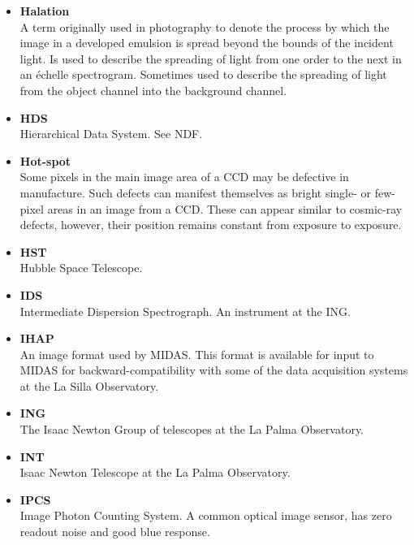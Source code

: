 \documentclass[twoside,11pt]{article}
\newcommand{\htmlref}[2]{#1}
\begin{document}
\begin{itemize}
\item {\bf\label{gl_halation}Halation}\\
      A term originally used in photography to denote the process by which
      the image in a developed emulsion is spread beyond the bounds of the
      incident light.  Is used to describe the spreading of light from
      one order to the next in an \'{e}chelle spectrogram.  Sometimes used
      to describe the spreading of light from the object channel into the
      background channel.

\item {\bf\label{gl_hds}HDS}\\
      Hierarchical Data System.  See \htmlref{NDF}{gl_ndf}.

\item {\bf\label{gl_hotspot}Hot-spot}\\
      Some pixels in the main image area of a \htmlref{CCD}{gl_ccd} may
      be defective in manufacture.  Such defects can manifest themselves
      as bright single- or few-pixel areas in an image from a CCD\@.
      These can appear similar to cosmic-ray defects, however, their
      position remains constant from exposure to exposure.

\item {\bf\label{gl_hst}HST}\\
      Hubble Space Telescope.

\item {\bf\label{gl_ids}IDS}\\
      Intermediate Dispersion Spectrograph.  An instrument at the
      ING\@.

\item {\bf\label{gl_ihap}IHAP}\\
      An image format used by MIDAS.  This format is available for
      input to MIDAS for backward-compatibility with some of the
      data acquisition systems at the La Silla Observatory.

\item {\bf\label{gl_ing}ING}\\
      The Isaac Newton Group of telescopes at the La Palma Observatory.

\item {\bf\label{gl_int}INT}\\
      Isaac Newton Telescope at the La Palma Observatory.

\item {\bf\label{gl_ipcs}IPCS}\\
      Image Photon Counting System.  A common optical image sensor,
      has zero \htmlref{readout noise}{gl_readout_noise} and good blue
      response.


\end{itemize}
\end{document}
